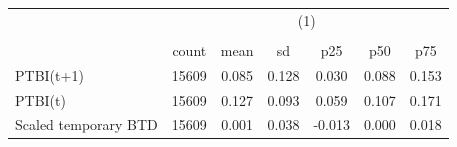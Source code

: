 {
\def\sym#1{\ifmmode^{#1}\else\(^{#1}\)\fi}
\begin{tabular}{l*{1}{cccccc}}
\hline\hline
                    &\multicolumn{6}{c}{(1)}                                                      \\
                    &\multicolumn{6}{c}{}                                                         \\
                    &       count&        mean&          sd&         p25&         p50&         p75\\
\hline
PTBI(t+1)           &       15609&       0.085&       0.128&       0.030&       0.088&       0.153\\
PTBI(t)             &       15609&       0.127&       0.093&       0.059&       0.107&       0.171\\
Scaled temporary BTD&       15609&       0.001&       0.038&      -0.013&       0.000&       0.018\\
\hline\hline
\end{tabular}
}
